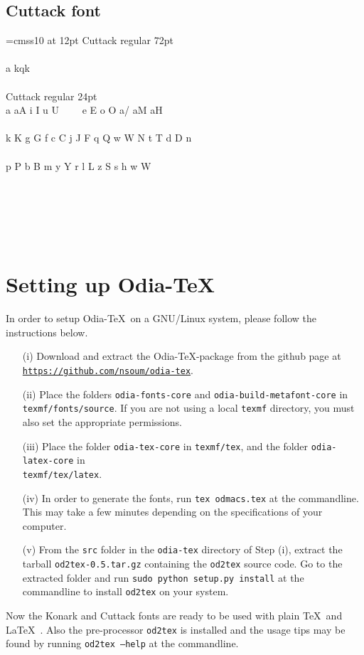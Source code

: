 \documentclass[12pt]{article}
\def\odtex{Odia-\TeX}
\begin{document}
\subsection{Cuttack font}
\font\ssbfXII=cmss10 at 12pt
Cuttack regular 72pt\\ \\
{\hugecttck{}a kqk}\\ \\
Cuttack regular 24pt\\
{\largecttck{}a aA i I u U \odvowelri\ \odvowelrii\ \odvowelli\ \odvowellii\ e E o O a/ aM aH}\\ \\
{\largecttck{}k K g G f c C j J F q Q w W N t T d D n}\\ \\
{\largecttck{}p P b B m y Y r l L z S s h \odkSa{} w\odnukta{} W\odnukta}\\ \\
{\bigcttck{}\odmatras}\\ \\
{\bigcttck{}\odfigures}\\ \\
{\bigcttck{}\odsigns} 


\section{Setting up \odtex\ }
In order to setup \odtex\ on a GNU/Linux system, please follow the instructions below.
\begin{itemize}
\item[(i)] Download and extract the \odtex-package from the github page at \\
{\tt \url{https://github.com/nsoum/odia-tex}}. 
\item[(ii)] Place the folders {\tt odia-fonts-core} and {\tt odia-build-metafont-core} in {\tt texmf/fonts/source}. If you are not using a
local {\tt texmf} directory, you must also set the appropriate permissions.
\item[(iii)] Place the folder {\tt odia-tex-core} in {\tt texmf/tex}, and the folder {\tt odia-latex-core} in \\
{\tt texmf/tex/latex}.
\item[(iv)] In order to generate the fonts, run {\tt tex odmacs.tex} at the commandline. This may take a few minutes depending on the specifications of your computer.
\item[(v)] From the {\tt src} folder in the {\tt odia-tex} directory of Step (i), extract the tarball {\tt od2tex-0.5.tar.gz} containing the {\tt od2tex} source code. Go to the extracted folder and run {\tt sudo python setup.py install} at the commandline to install {\tt od2tex} on your system.
\end{itemize}
Now the Konark and Cuttack fonts are ready to be used with plain \TeX\ and \LaTeX\ . Also the pre-processor {\tt od2tex} is installed and the usage tips may be found by running {\tt od2tex --help} at the commandline.
\end{document}
